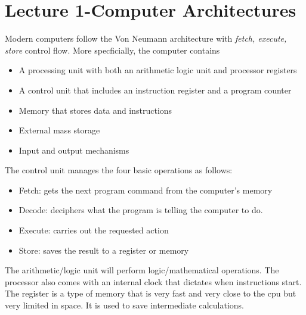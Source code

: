 \documentclass{article}
\begin{document}
\section*{Lecture 1-Computer Architectures}
\indent Modern computers follow the Von Neumann architecture with \textit{fetch, execute, store} control flow. 
More specficially, the computer contains
\begin{itemize}
    \item A processing unit with both an arithmetic logic unit  and processor registers
    \item A control unit that includes an instruction register and a program counter
    \item Memory that stores data and instructions
    \item External mass storage
    \item Input and output mechanisms
\end{itemize}
The control unit manages the four basic operations as follows:
\begin{itemize}
    \item Fetch: gets the next program command from the computer's memory
    \item Decode: deciphers what the program is telling the computer to do.
    \item Execute: carries out the requested action
    \item Store: saves the result to a register or memory
\end{itemize}
The arithmetic/logic unit will perform logic/mathematical operations. The processor also comes with an internal clock that dictates when instructions start.
The register is a type of memory that is very fast and very close to the cpu but very limited in space. It is used to save intermediate calculations.
\end{document}
